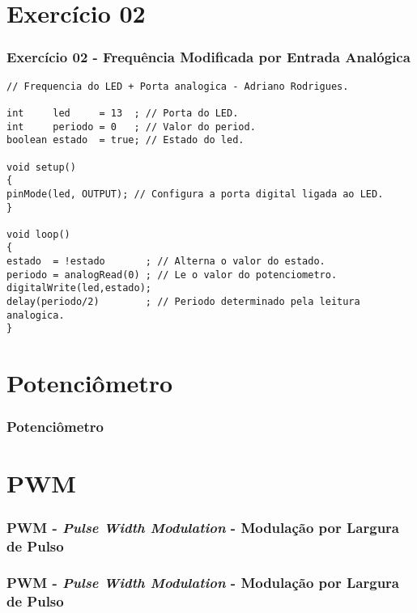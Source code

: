 \documentclass{beamer}
\begin{document}
\section{Exercício 02}
\begin{frame}[fragile]
	\frametitle{Exercício 02 - Frequência Modificada por Entrada Analógica}
	
	\begin{lstlisting}[style=Arduino,basicstyle=\scriptsize \ttfamily]
// Frequencia do LED + Porta analogica - Adriano Rodrigues.

int     led     = 13  ; // Porta do LED.
int     periodo = 0   ; // Valor do period.
boolean estado  = true; // Estado do led.

void setup()
{
pinMode(led, OUTPUT); // Configura a porta digital ligada ao LED.
}

void loop()
{
estado  = !estado       ; // Alterna o valor do estado.
periodo = analogRead(0) ; // Le o valor do potenciometro.
digitalWrite(led,estado);
delay(periodo/2)        ; // Periodo determinado pela leitura analogica.
}	\end{lstlisting}
\end{frame}

\section{Potenciômetro}
\begin{frame}
	\frametitle{Potenciômetro}
		 \hspace{0pt}
\end{frame}

\section{PWM}
\begin{frame}
	\frametitle{PWM - \textit{Pulse Width Modulation} - Modulação por Largura de Pulso}
	\begin{center}
	\end{center}
\end{frame}

\begin{frame}
	\frametitle{PWM - \textit{Pulse Width Modulation} - Modulação por Largura de Pulso}
	\begin{center}
	\end{center}
\end{frame}
\end{document}
